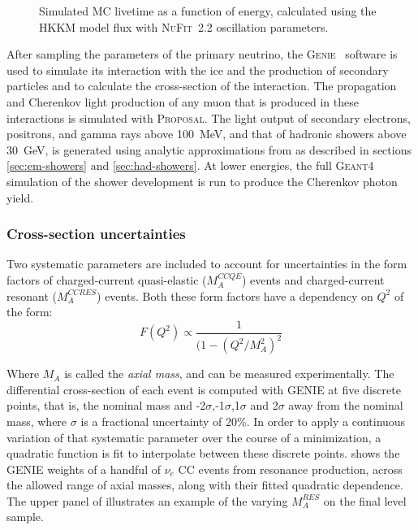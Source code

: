 \begin{figure}
    \centering
    
    \caption{Simulated MC livetime as a function of energy, calculated using the HKKM model flux with \textsc{NuFit}~2.2\cite{nufit22} oscillation parameters.}
    \label{fig:sim-livetime}
\end{figure}

After sampling the parameters of the primary neutrino, the \textsc{Genie}~ software is used to simulate its interaction with the ice and the production of secondary particles and to calculate the cross-section of the interaction. The propagation and Cherenkov light production of any muon that is produced in these interactions is simulated with \textsc{Proposal}. The light output of secondary electrons, positrons, and gamma rays above 100~MeV, and that of hadronic showers above 30~GeV, is generated using analytic approximations from \cite{RADEL2013102} as described in sections \ref{sec:em-showers} and \ref{sec:had-showers}. At lower energies, the full \textsc{Geant4} simulation of the shower development is run to produce the Cherenkov photon yield.

\subsubsection{Cross-section uncertainties}
\label{sec:xsec_systs}
Two systematic parameters are included to account for uncertainties in the form factors of charged-current quasi-elastic ($M_{A}^{CCQE}$) events and charged-current resonant ($M_{A}^{CCRES}$) events. Both these form factors have a dependency on $Q^2$ of the form:\\

\begin{equation}
    F(Q^{2}) \propto \frac{1}{(1-(Q^{2}/M_{A}^{2})^{2}}
\end{equation}

Where $M_{A}$ is called the \textit{axial mass}, and can be measured experimentally.  The differential cross-section of each event is computed with \textsc{GENIE} at five discrete points, that is, the nominal mass and  -2$\sigma$,-1$\sigma$,1$\sigma$ and 2$\sigma$ away from the nominal mass, where $\sigma$ is a fractional uncertainty of 20\%. In order to apply a continuous variation of that systematic parameter over the course of a minimization, a quadratic function is fit to interpolate between these discrete points.   shows the \textsc{GENIE} weights of a handful of $\nu_{e}$ CC events from resonance production, across the allowed range of axial masses, along with their fitted quadratic dependence. The upper panel of  illustrates an example of the varying $M_{A}^{RES}$ on the final level sample.

